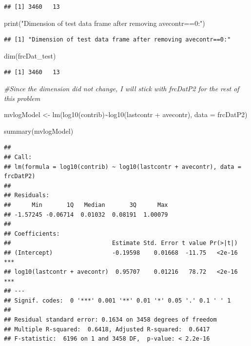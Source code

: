 \documentclass[
]{article}
\newenvironment{Shaded}{\begin{snugshade}}{\end{snugshade}}
\newcommand{\AttributeTok}[1]{\textcolor[rgb]{0.77,0.63,0.00}{#1}}
\newcommand{\CommentTok}[1]{\textcolor[rgb]{0.56,0.35,0.01}{\textit{#1}}}
\newcommand{\FunctionTok}[1]{\textcolor[rgb]{0.00,0.00,0.00}{#1}}
\newcommand{\NormalTok}[1]{#1}
\newcommand{\OtherTok}[1]{\textcolor[rgb]{0.56,0.35,0.01}{#1}}
\newcommand{\SpecialCharTok}[1]{\textcolor[rgb]{0.00,0.00,0.00}{#1}}
\newcommand{\StringTok}[1]{\textcolor[rgb]{0.31,0.60,0.02}{#1}}
\begin{document}
\begin{verbatim}
## [1] 3460   13
\end{verbatim}

\begin{Shaded}
\begin{Highlighting}[]
\FunctionTok{print}\NormalTok{(}\StringTok{"Dimension of test data frame after removing avecontr==0:"}\NormalTok{)}
\end{Highlighting}
\end{Shaded}

\begin{verbatim}
## [1] "Dimension of test data frame after removing avecontr==0:"
\end{verbatim}

\begin{Shaded}
\begin{Highlighting}[]
\FunctionTok{dim}\NormalTok{(frcDat\_test)}
\end{Highlighting}
\end{Shaded}

\begin{verbatim}
## [1] 3460   13
\end{verbatim}

\begin{Shaded}
\begin{Highlighting}[]
\CommentTok{\#Since the dimension did not change, I will stick with frcDatP2 for the rest of this problem}

\NormalTok{mvlogModel }\OtherTok{\textless{}{-}} \FunctionTok{lm}\NormalTok{(}\FunctionTok{log10}\NormalTok{(contrib)}\SpecialCharTok{\textasciitilde{}}\FunctionTok{log10}\NormalTok{(lastcontr }\SpecialCharTok{+}\NormalTok{ avecontr), }\AttributeTok{data =}\NormalTok{ frcDatP2)}

\FunctionTok{summary}\NormalTok{(mvlogModel)}
\end{Highlighting}
\end{Shaded}

\begin{verbatim}
## 
## Call:
## lm(formula = log10(contrib) ~ log10(lastcontr + avecontr), data = frcDatP2)
## 
## Residuals:
##      Min       1Q   Median       3Q      Max 
## -1.57245 -0.06714  0.01032  0.08191  1.00079 
## 
## Coefficients:
##                             Estimate Std. Error t value Pr(>|t|)    
## (Intercept)                 -0.19598    0.01668  -11.75   <2e-16 ***
## log10(lastcontr + avecontr)  0.95707    0.01216   78.72   <2e-16 ***
## ---
## Signif. codes:  0 '***' 0.001 '**' 0.01 '*' 0.05 '.' 0.1 ' ' 1
## 
## Residual standard error: 0.1634 on 3458 degrees of freedom
## Multiple R-squared:  0.6418, Adjusted R-squared:  0.6417 
## F-statistic:  6196 on 1 and 3458 DF,  p-value: < 2.2e-16
\end{verbatim}
\end{document}
